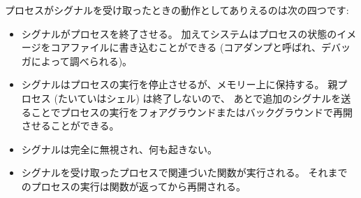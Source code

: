 プロセスがシグナルを受け取ったときの動作としてありえるのは次の四つです:
%
\begin{itemize}
\item
  シグナルがプロセスを終了させる。
  加えてシステムはプロセスの状態のイメージをコアファイルに書き込むことができる
  (コアダンプと呼ばれ、デバッガによって調べられる)。
%
\item
  シグナルはプロセスの実行を停止させるが、メモリー上に保持する。
  親プロセス (たいていはシェル) は終了しないので、
  あとで追加のシグナルを送ることでプロセスの実行をフォアグラウンドまたはバックグラウンドで再開させることができる。
%
\item %
  シグナルは完全に無視され、何も起きない。
%
\item
シグナルを受け取ったプロセスで関連づいた関数が実行される。
それまでのプロセスの実行は関数が返ってから再開される。
\end{itemize}
%

